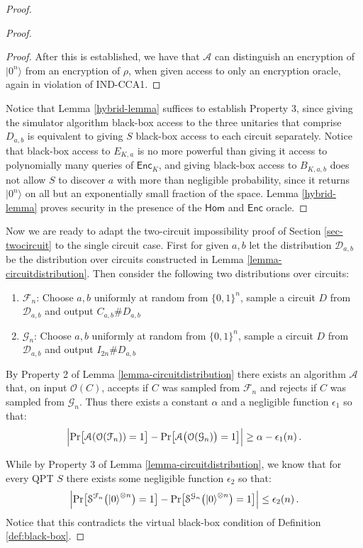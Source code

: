 \documentclass[11pt]{article}
\numberwithin{equation}{section}
\newcommand{\algo}{\mathcal}
\newcommand{\Enc}{\ensuremath{\mathsf{Enc}}\xspace}
\newcommand{\Homorcl}{\ensuremath{\mathsf{Hom}}\xspace}
\begin{document}
{\begin{proof}
\begin{proof}
\begin{proof}
After this is established, we have that $\algo{A}$ can distinguish an encryption of $|0^n\rangle$ from an encryption of $\rho$, when given access to only an encryption oracle, again in violation of IND-CCA1. 
\end{proof}
Notice that Lemma \ref{hybrid-lemma} suffices to establish Property 3, since giving the simulator algorithm black-box access to the three unitaries that comprise $D_{a,b}$ is equivalent to giving $S$ black-box access to each circuit separately.  Notice that black-box access to  $E_{K,a}$ is no more powerful than giving it access to polynomially many queries of $\Enc_{K}$, and giving black-box access to $B_{K,a,b}$ does not allow $S$ to discover $a$ with more than negligible probability, since it returns $|0^n\rangle$ on all but an exponentially small fraction of the space.  Lemma \ref{hybrid-lemma} proves security in the presence of the $\Homorcl$ and $\Enc$ oracle.
\end{proof}

Now we are ready to adapt the two-circuit impossibility proof of Section \ref{sec-twocircuit} to the single circuit case.  First for given $a,b$ let the distribution $\mathcal{D}_{a,b}$ be the distribution over circuits constructed in Lemma \ref{lemma-circuitdistribution}.  Then consider the following two distributions over circuits: \begin{enumerate}
 	\item{$\mathcal{F}_{n}$: Choose $a,b$ uniformly at random from $\{0,1\}^n$,  sample a circuit $D$ from $\mathcal{D}_{a,b}$ and output $C_{a,b}\# D_{a,b}$ 
}
\item{$\mathcal{G}_{n}$: Choose $a,b$ uniformly at random from $\{0,1\}^n$,  sample a circuit $D$ from $\mathcal{D}_{a,b}$ and output $I_{2n}\# D_{a,b}$ }
 \end{enumerate}
 By Property 2 of Lemma \ref{lemma-circuitdistribution} 
 there exists an algorithm $\algo{A}$ that, on input $\mathcal{O}(C)$, accepts if $C$ was sampled from $\algo{F}_n$ and rejects if $C$ was sampled from $\algo{G}_n$.  Thus there exists a constant $\alpha$ and a negligible function $\epsilon_1$ so that:
$$\Bigl| \text{Pr}\bigl[\mathcal A(\mathcal{O}(\mathcal{F}_n)) = 1\bigr]- \text{Pr}\bigl[\mathcal A\bigl(\mathcal{O}(\mathcal{G}_n)\bigr) = 1\bigr] \Bigr| \geq \alpha-\epsilon_1(n)\,.$$
 
 While by Property 3 of Lemma \ref{lemma-circuitdistribution}, we know that for every QPT $S$ there exists some negligible function $\epsilon_2$ so that: 
 $$\label{eqn1}\Bigl| \text{Pr}\bigl[\mathcal S^{\mathcal{F}_n}\bigl({\left\vert{0}\right\rangle}^{\otimes n}\bigr) = 1\bigr]- \text{Pr}\bigl[\mathcal S^{\mathcal{G}_n}\bigl({\left\vert{0}\right\rangle}^{\otimes n}\bigr) = 1\bigr] \Bigr| \leq \epsilon_2(n)\,.$$
Notice that this contradicts the virtual black-box condition of Definition \ref{def:black-box}.
  

\end{proof}}
\end{document}
